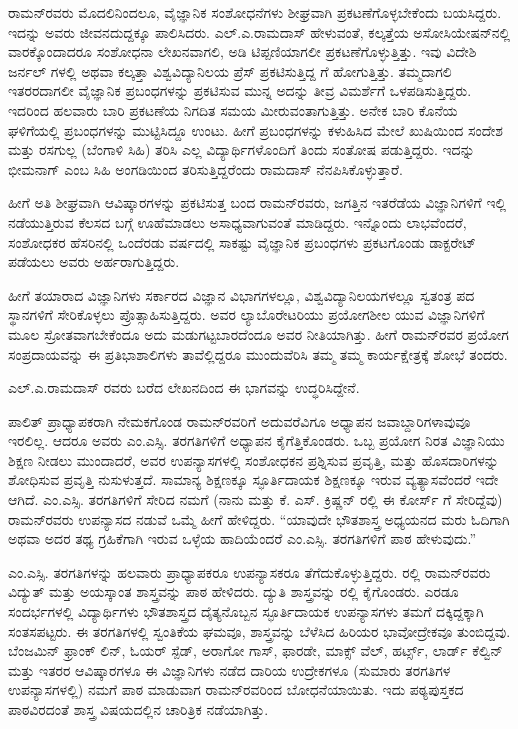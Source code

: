 ರಾಮನ್‍ರವರು ಮೊದಲಿನಿಂದಲೂ, ವೈಜ್ಞಾನಿಕ ಸಂಶೋಧನೆಗಳು ಶೀಘ್ರವಾಗಿ ಪ್ರಕಟಣೆಗೊಳ್ಳ\-ಬೇಕೆಂದು ಬಯಸಿದ್ದರು. ಇದನ್ನು ಅವರು ಜೀವನದುದ್ದಕ್ಕೂ ಪಾಲಿಸಿದರು. ಎಲ್.ಎ.ರಾಮದಾಸ್ ಹೇಳುವಂತೆ, ಕಲ್ಕತ್ತೆಯ ಅಸೋಸಿಯೇಷನ್‍ನಲ್ಲಿ ವಾರಕ್ಕೊಂದಾದರೂ ಸಂಶೋಧನಾ ಲೇಖನವಾಗಲಿ, ಅಡಿ ಟಿಪ್ಪಣಿಯಾಗಲೀ ಪ್ರಕಟಣೆಗೊಳ್ಳುತ್ತಿತ್ತು. ಇವು ವಿದೇಶಿ ಜರ್ನಲ್ ಗಳಲ್ಲಿ ಅಥವಾ ಕಲ್ಕತ್ತಾ ವಿಶ್ವವಿದ್ಯಾನಿಲಯ ಪ್ರೆಸ್ ಪ್ರಕಟಿಸುತ್ತಿದ್ದ \textit{}ಗೆ ಹೋಗುತ್ತಿತ್ತು. ತಮ್ಮದಾಗಲಿ ಇತರರದಾಗಲೀ ವೈಜ್ಞಾನಿಕ ಪ್ರಬಂಧಗಳನ್ನು ಪ್ರಕಟಿಸುವ ಮುನ್ನ ಅದನ್ನು ತೀವ್ರ ವಿಮರ್ಶೆಗೆ ಒಳಪಡಿಸುತ್ತಿದ್ದರು. ಇದರಿಂದ ಹಲವಾರು ಬಾರಿ ಪ್ರಕಟಣೆಯ ನಿಗದಿತ ಸಮಯ ಮೀರುವಂತಾಗುತ್ತಿತ್ತು. ಅನೇಕ ಬಾರಿ ಕೊನೆಯ ಘಳಿಗೆಯಲ್ಲಿ ಪ್ರಬಂಧಗಳನ್ನು ಮುಟ್ಟಿಸಿದ್ದೂ ಉಂಟು. ಹೀಗೆ ಪ್ರಬಂಧಗಳನ್ನು ಕಳುಹಿಸಿದ ಮೇಲೆ ಖುಷಿಯಿಂದ ಸಂದೇಶ ಮತ್ತು ರಸಗುಲ್ಲ (ಬೆಂಗಾಳಿ ಸಿಹಿ) ತರಿಸಿ ಎಲ್ಲ ವಿದ್ಯಾರ್ಥಿಗಳೊಂದಿಗೆ ತಿಂದು ಸಂತೋಷ ಪಡುತ್ತಿದ್ದರು. ಇದನ್ನು ಭೀಮನಾಗ್ ಎಂಬ ಸಿಹಿ ಅಂಗಡಿಯಿಂದ ತರಿಸುತ್ತಿದ್ದರೆಂದು ರಾಮದಾಸ್ ನೆನಪಿಸಿಕೊಳ್ಳುತ್ತಾರೆ.

ಹೀಗೆ ಅತಿ ಶೀಘ್ರವಾಗಿ ಆವಿಷ್ಕಾರಗಳನ್ನು ಪ್ರಕಟಿಸುತ್ತ ಬಂದ ರಾಮನ್‍ರವರು, ಜಗತ್ತಿನ ಇತರೆಡೆಯ ವಿಜ್ಞಾನಿಗಳಿಗೆ ಇಲ್ಲಿ ನಡೆಯುತ್ತಿರುವ ಕೆಲಸದ ಬಗ್ಗೆ ಊಹೆಮಾಡಲು ಅಸಾಧ್ಯವಾಗುವಂತೆ ಮಾಡಿದ್ದರು. ಇನ್ನೊಂದು ಲಾಭವೆಂದರೆ, ಸಂಶೋಧಕರ ಹೆಸರಿನಲ್ಲಿ ಒಂದೆರಡು ವರ್ಷದಲ್ಲಿ ಸಾಕಷ್ಟು ವೈಜ್ಞಾನಿಕ ಪ್ರಬಂಧಗಳು ಪ್ರಕಟಗೊಂಡು ಡಾಕ್ಟರೇಟ್ ಪಡೆಯಲು ಅವರು ಅರ್ಹರಾಗುತ್ತಿದ್ದರು.

ಹೀಗೆ ತಯಾರಾದ ವಿಜ್ಞಾನಿಗಳು ಸರ್ಕಾರದ ವಿಜ್ಞಾನ ವಿಭಾಗಗಳಲ್ಲೂ, ವಿಶ್ವವಿದ್ಯಾನಿಲಯಗಳಲ್ಲೂ ಸ್ವತಂತ್ರ ಪದ ಸ್ಥಾನಗಳಿಗೆ ಸೇರಿಕೊಳ್ಳಲು ಪ್ರೊತ್ಸಾಹಿಸುತ್ತಿದ್ದರು. ಅವರ ಲ್ಯಾಬೊರೇಟರಿಯು ಪ್ರಯೋಗಶೀಲ ಯುವ ವಿಜ್ಞಾನಿಗಳಿಗೆ ಮೂಲ ಸ್ರೋತವಾಗಬೇಕೆಂದೂ ಅದು ಮಡುಗಟ್ಟಬಾರದೆಂದೂ ಅವರ ನೀತಿಯಾಗಿತ್ತು. ಹೀಗೆ ರಾಮನ್‍ರವರ ಪ್ರಯೋಗ ಸಂಪ್ರದಾಯವನ್ನು ಈ ಪ್ರತಿಭಾಶಾಲಿಗಳು ತಾವೆಲ್ಲಿದ್ದರೂ ಮುಂದುವೆರಿಸಿ ತಮ್ಮ ತಮ್ಮ ಕಾರ್ಯಕ್ಷೇತ್ರಕ್ಕೆ ಶೋಭೆ ತಂದರು.



ಎಲ್.ಎ.ರಾಮದಾಸ್ ರವರು ಬರೆದ ಲೇಖನದಿಂದ ಈ ಭಾಗವನ್ನು ಉದ್ಧರಿಸಿದ್ದೇನೆ.

\enginline{-}ಪಾಲಿತ್ ಪ್ರಾಧ್ಯಾಪಕರಾಗಿ ನೇಮಕಗೊಂಡ ರಾಮನ್‍ರವರಿಗೆ ಅದುವರೆವಿಗೂ ಅಧ್ಯಾಪನ ಜವಾಬ್ದಾರಿಗಳಾವುವೂ ಇರಲಿಲ್ಲ. ಆದರೂ ಅವರು ಎಂ.ಎಸ್ಸಿ. ತರಗತಿಗಳಿಗೆ ಅಧ್ಯಾಪನ ಕೈಗೆತ್ತಿಕೊಂಡರು. ಒಬ್ಬ ಪ್ರಯೋಗ ನಿರತ ವಿಜ್ಞಾನಿಯು ಶಿಕ್ಷಣ ನೀಡಲು ಮುಂದಾದರೆ, ಅವರ ಉಪನ್ಯಾಸಗಳಲ್ಲಿ ಸಂಶೋಧಕನ ಪ್ರಶ್ನಿಸುವ ಪ್ರವೃತ್ತಿ, ಮತ್ತು ಹೊಸದಾರಿಗಳನ್ನು ಶೋಧಿಸುವ ಪ್ರವೃತ್ತಿ ನುಸುಳುತ್ತದೆ. ಸಾಮಾನ್ಯ ಶಿಕ್ಷಣಕ್ಕೂ ಸ್ಫೂರ್ತಿದಾಯಕ ಶಿಕ್ಷಣಕ್ಕೂ ಇರುವ ವ್ಯತ್ಯಾಸವೆಂದರೆ ಇದೇ ಆಗಿದೆ. ಎಂ.ಎಸ್ಸಿ. ತರಗತಿಗಳಿಗೆ ಸೇರಿದ ನಮಗೆ (ನಾನು ಮತ್ತು ಕೆ. ಎಸ್. ಕ್ರಿಷ್ಣನ್ ರಲ್ಲಿ ಈ ಕೋರ್ಸ್ ಗೆ ಸೇರಿದ್ದೆವು) ರಾಮನ್‍ರವರು ಉಪನ್ಯಾಸದ ನಡುವೆ ಒಮ್ಮೆ ಹೀಗೆ ಹೇಳಿದ್ದರು. “ಯಾವುದೇ ಭೌತಶಾಸ್ತ್ರ ಅಧ್ಯಯನದ ಮರು ಓದಿಗಾಗಿ ಅಥವಾ ಅದರ ತಥ್ಯ ಗ್ರಹಿಕೆಗಾಗಿ ಇರುವ ಒಳ್ಳೆಯ ಹಾದಿಯೆಂದರೆ ಎಂ.ಎಸ್ಸಿ. ತರಗತಿಗಳಿಗೆ ಪಾಠ ಹೇಳುವುದು.”

ಎಂ.ಎಸ್ಸಿ. ತರಗತಿಗಳನ್ನು ಹಲವಾರು ಪ್ರಾಧ್ಯಾಪಕರೂ ಉಪನ್ಯಾಸಕರೂ ತೆಗೆದುಕೊಳ್ಳುತ್ತಿದ್ದರು. ರಲ್ಲಿ ರಾಮನ್‍ರವರು ವಿದ್ಯುತ್ ಮತ್ತು ಅಯಸ್ಕಾಂತ ಶಾಸ್ತ್ರವನ್ನು ಪಾಠ ಹೇಳಿದರು. ದ್ಯುತಿ ಶಾಸ್ತ್ರವನ್ನು ರಲ್ಲಿ ಕೈಗೊಂಡರು. ಎರಡೂ ಸಂದರ್ಭಗಳಲ್ಲಿ ವಿದ್ಯಾರ್ಥಿಗಳು ಭೌತಶಾಸ್ತ್ರದ ದೈತ್ಯನೊಬ್ಬನ ಸ್ಫೂರ್ತಿದಾಯಕ ಉಪನ್ಯಾಸಗಳು ತಮಗೆ ದಕ್ಕಿದ್ದಕ್ಕಾಗಿ ಸಂತಸಪಟ್ಟರು. ಈ ತರಗತಿಗಳಲ್ಲಿ ಸ್ವಂತಿಕೆಯ ಘಮವೂ, ಶಾಸ್ತ್ರವನ್ನು ಬೆಳೆಸಿದ ಹಿರಿಯರ ಭಾವೋದ್ರೇಕವೂ ತುಂಬಿದ್ದವು. ಬೆಂಜಮಿನ್ ಫ್ರಾಂಕ್ ಲಿನ್, ಓಯರ್ ಸ್ಪೆಡ್, ಅರಾಗೋ ಗಾಸ್, ಫಾರಡೇ, ಮಾಕ್ಸ್ ವೆಲ್, ಹರ್ಟ್ಸ್, ಲಾರ್ಡ್ ಕೆಲ್ವಿನ್ ಮತ್ತು ಇತರರ ಆವಿಷ್ಕಾರಗಳೂ ಈ ವಿಜ್ಞಾನಿಗಳು ನಡೆದ ದಾರಿಯ ಉದ್ರೇಕಗಳೂ (ಸುಮಾರು  ತರಗತಿಗಳ ಉಪನ್ಯಾಸಗಳಲ್ಲಿ) ನಮಗೆ \textit{} ಪಾಠ ಮಾಡುವಾಗ ರಾಮನ್‍ರವರಿಂದ ಬೋಧನೆಯಾಯಿತು. ಇದು ಪಠ್ಯಪುಸ್ತಕದ ಪಾಠವಿರದಂತೆ ಶಾಸ್ತ್ರ ವಿಷಯದಲ್ಲಿನ ಚಾರಿತ್ರಿಕ ನಡೆಯಾಗಿತ್ತು.

